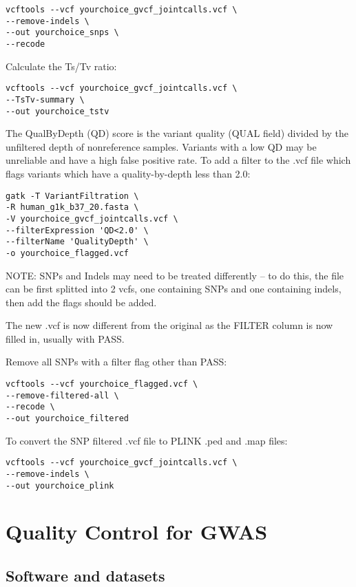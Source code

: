 \documentclass[]{book}
\begin{document}
\begin{verbatim}
vcftools --vcf yourchoice_gvcf_jointcalls.vcf \
--remove-indels \
--out yourchoice_snps \
--recode
\end{verbatim}

Calculate the Ts/Tv ratio:

\begin{verbatim}
vcftools --vcf yourchoice_gvcf_jointcalls.vcf \
--TsTv-summary \
--out yourchoice_tstv
\end{verbatim}

The QualByDepth (QD) score is the variant quality (QUAL field) divided
by the unfiltered depth of nonreference samples. Variants with a low QD
may be unreliable and have a high false positive rate. To add a filter
to the .vcf file which flags variants which have a quality-by-depth less
than 2.0:

\begin{verbatim}
gatk -T VariantFiltration \
-R human_g1k_b37_20.fasta \
-V yourchoice_gvcf_jointcalls.vcf \
--filterExpression 'QD<2.0' \
--filterName 'QualityDepth' \
-o yourchoice_flagged.vcf
\end{verbatim}

NOTE: SNPs and Indels may need to be treated differently -- to do this,
the file can be first splitted into 2 vcfs, one containing SNPs and one
containing indels, then add the flags should be added.

The new .vcf is now different from the original as the FILTER column is
now filled in, usually with PASS.

Remove all SNPs with a filter flag other than PASS:

\begin{verbatim}
vcftools --vcf yourchoice_flagged.vcf \
--remove-filtered-all \
--recode \
--out yourchoice_filtered
\end{verbatim}

To convert the SNP filtered .vcf file to PLINK .ped and .map files:

\begin{verbatim}
vcftools --vcf yourchoice_gvcf_jointcalls.vcf \
--remove-indels \
--out yourchoice_plink
\end{verbatim}

\section{Quality Control for GWAS}\label{quality-control-for-gwas}

\subsection{Software and datasets}\label{software-and-datasets}
\end{document}
